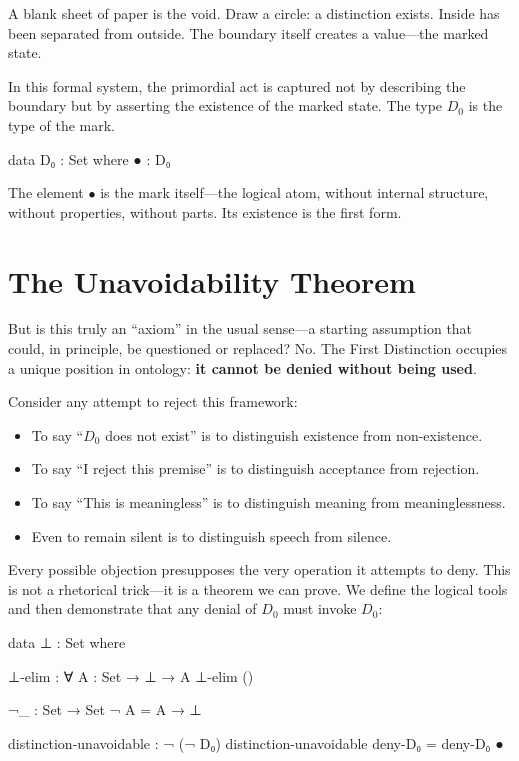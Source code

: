 \documentclass[11pt,a4paper]{book}
\begin{document}
A blank sheet of paper is the void. Draw a circle: a distinction exists. Inside has been separated from outside. The boundary itself creates a value—the marked state.

In this formal system, the primordial act is captured not by describing the boundary but by asserting the existence of the marked state. The type $D_0$ is the type of the mark.

\begin{code}
data D₀ : Set where
  ● : D₀
\end{code}

The element $\bullet$ is the mark itself—the logical atom, without internal structure, without properties, without parts. Its existence is the first form.

\section{The Unavoidability Theorem}

But is this truly an ``axiom'' in the usual sense---a starting assumption that 
could, in principle, be questioned or replaced? No. The First Distinction 
occupies a unique position in ontology: \textbf{it cannot be denied without 
being used}.

Consider any attempt to reject this framework:
\begin{itemize}
\item To say ``$D_0$ does not exist'' is to distinguish existence from non-existence.
\item To say ``I reject this premise'' is to distinguish acceptance from rejection.
\item To say ``This is meaningless'' is to distinguish meaning from meaninglessness.
\item Even to remain silent is to distinguish speech from silence.
\end{itemize}

Every possible objection presupposes the very operation it attempts to deny. 
This is not a rhetorical trick---it is a theorem we can prove. We define the 
logical tools and then demonstrate that any denial of $D_0$ must invoke $D_0$:

\begin{code}
data ⊥ : Set where

⊥-elim : ∀ {A : Set} → ⊥ → A
⊥-elim ()

¬_ : Set → Set
¬ A = A → ⊥

distinction-unavoidable : ¬ (¬ D₀)
distinction-unavoidable deny-D₀ = deny-D₀ ●
\end{code}
\end{document}
